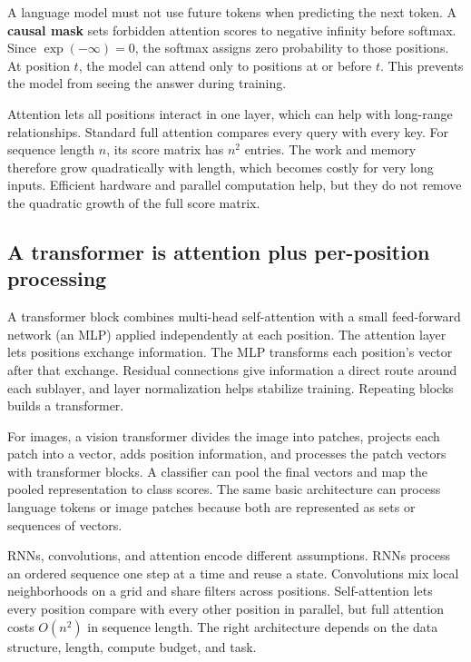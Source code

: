 A language model must not use future tokens when predicting the next token. A \textbf{causal mask} sets forbidden attention scores to negative infinity before softmax. Since \(\exp(-\infty)=0\), the softmax assigns zero probability to those positions. At position \(t\), the model can attend only to positions at or before \(t\). This prevents the model from seeing the answer during training.

Attention lets all positions interact in one layer, which can help with long-range relationships. Standard full attention compares every query with every key. For sequence length \(n\), its score matrix has \(n^2\) entries. The work and memory therefore grow quadratically with length, which becomes costly for very long inputs. Efficient hardware and parallel computation help, but they do not remove the quadratic growth of the full score matrix.

\subsection{A transformer is attention plus per-position processing}\label{04-visual-computing-ii-ch031-a-transformer-is-attention-plus-per-position-processing}

\hypertarget{04-visual-computing-ii-ch031-a-transformer-is-attention-plus-per-position-processing}{}

A transformer block combines multi-head self-attention with a small feed-forward network (an MLP) applied independently at each position. The attention layer lets positions exchange information. The MLP transforms each position's vector after that exchange. Residual connections give information a direct route around each sublayer, and layer normalization helps stabilize training. Repeating blocks builds a transformer.

For images, a vision transformer divides the image into patches, projects each patch into a vector, adds position information, and processes the patch vectors with transformer blocks. A classifier can pool the final vectors and map the pooled representation to class scores. The same basic architecture can process language tokens or image patches because both are represented as sets or sequences of vectors.

RNNs, convolutions, and attention encode different assumptions. RNNs process an ordered sequence one step at a time and reuse a state. Convolutions mix local neighborhoods on a grid and share filters across positions. Self-attention lets every position compare with every other position in parallel, but full attention costs \(O(n^2)\) in sequence length. The right architecture depends on the data structure, length, compute budget, and task.


